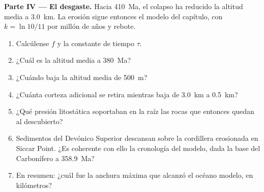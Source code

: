 \begin{problem}
\noindent\textbf{Parte IV --- El desgaste.} Hacia \qty{410}{Ma}, el colapso ha reducido la altitud
media a \qty{3.0}{km}. La erosión sigue entonces el modelo del capítulo, con $k = \ln
10/11$ por millón de años y rebote.
\begin{enumerate}[resume]
\item Calcúlense $f$ y la constante de tiempo $\tau$.
\item ¿Cuál es la altitud media a \qty{380}{Ma}?
\item ¿Cuándo baja la altitud media de \qty{500}{m}?
\item ¿Cuánta corteza adicional se retira mientras baja de \qty{3.0}{km} a \qty{0.5}{km}?
\item ¿Qué presión litostática soportaban en la raíz las rocas que entonces quedan al descubierto?
\item Sedimentos del Devónico Superior descansan sobre la cordillera erosionada en Siccar Point. ¿Es coherente
con ello la cronología del modelo, dada la base del Carbonífero a \qty{358.9}{Ma}?
\item En resumen: ¿cuál fue la anchura máxima que alcanzó el océano modelo, en kilómetros?
\end{enumerate}
\end{problem}
